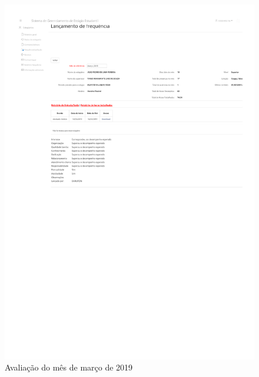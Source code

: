 \begin{anexosenv}
\begin{figure}
    \centering
    \includegraphics[trim=100 410 0 140, clip, width=\textwidth]{anexos/avaliacao201903}
    \caption{Avaliação do mês de março de 2019}
    \label{fig:avaliacao201903}
\end{figure}


\end{anexosenv}
